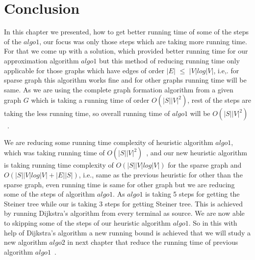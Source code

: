  \section{Conclusion}
 In this chapter we presented, how to get better running time of some of the steps of the $algo1$, our focus was only those steps which are taking more running time. For that we come up with a solution, which provided better running time for our approximation algorithm $algo1$ but this method of reducing running time only applicable for those graphs which have edges of order $|E|$ $\leq$ $|V|log|V|$, i.e,. for sparse graph this algorithm works fine and for other graphs running time will be same. As we are using the complete graph formation algorithm from a given graph $G$ which is taking a running time of order $O(|S||V|^2)$, rest of the steps are taking the less running time, so overall running time of $algo1$ will be $O(|S||V|^2)$~\cite{markowsky}. 

 We are reducing some running time complexity of heuristic algorithm $algo1$, which was taking running time of $O(|S||V|^2)$~\cite{markowsky}, and our new heuristic algorithm is taking running time complexity of $O(|S||V|log|V|)$ for the sparse graph and $O(|S||V|log|V| + |E||S|)$, i.e., same as the previous heuristic for other than the sparse graph, even running time is same for other graph but we are reducing some of the steps of algorithm $algo1$. As $algo1$ is taking 5 steps for getting the Steiner tree while our is taking 3 steps for getting Steiner tree. This is achieved by running Dijkstra's algorithm from every terminal as source. We are now able to skipping some of the steps of our heuristic algorithm $algo1$. So in this with help of Dijkstra's algorithm a new running bound is achieved that we will study a new algorithm $algo2$ in next chapter that reduce the running time of previous algorithm $algo1$~\cite{markowsky}. 